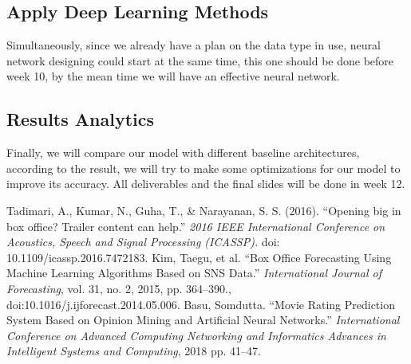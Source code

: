 \documentclass[conference]{IEEEtran}
\begin{document}
\subsection{Apply Deep Learning Methods}

Simultaneously, since we already have a plan on the data type in use, neural network designing could start at the same time, this one should be done before week 10, by the mean time we will have an effective neural network.

\subsection{Results Analytics}

Finally, we will compare our model with different baseline architectures, according to the result, we will try to make some optimizations for our model to improve its accuracy. All deliverables and the final slides will be done in week 12.

\begin{thebibliography}{00}
  
   Tadimari, A., Kumar, N., Guha, T., \& Narayanan, S. S. (2016). ``Opening big in box office? Trailer content can help.'' \emph{2016 IEEE International Conference on Acoustics, Speech and Signal Processing (ICASSP).} doi: 10.1109/icassp.2016.7472183.
   Kim, Taegu, et al. ``Box Office Forecasting Using Machine Learning Algorithms Based on SNS Data.'' \emph{International Journal of Forecasting}, vol. 31, no. 2, 2015, pp. 364–390., doi:10.1016/j.ijforecast.2014.05.006.
   Basu, Somdutta. ``Movie Rating Prediction System Based on Opinion Mining and Artificial Neural Networks.'' \emph{International Conference on Advanced Computing Networking and Informatics Advances in Intelligent Systems and Computing}, 2018 pp. 41–47.

\end{thebibliography}
\end{document}
